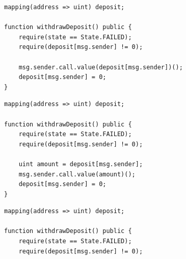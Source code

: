 \documentclass[xcolor=x11names,compress]{beamer}
\begin{document}
\begin{frame}[fragile]
\begin{overprint}
\begin{center}
		\end{center}
		\begin{minipage}[c][0.7\textheight][c]{\textwidth}
			\begin{verbatim}
mapping(address => uint) deposit;

function withdrawDeposit() public {
    require(state == State.FAILED);
    require(deposit[msg.sender] != 0);
    
    msg.sender.call.value(deposit[msg.sender])();
    deposit[msg.sender] = 0;
}
    \end{verbatim}
		\end{minipage}
		\begin{minipage}[c][0.7\textheight][c]{\textwidth}
			\begin{verbatim}
mapping(address => uint) deposit;

function withdrawDeposit() public {
    require(state == State.FAILED);
    require(deposit[msg.sender] != 0);
    
    uint amount = deposit[msg.sender];
    msg.sender.call.value(amount)();
    deposit[msg.sender] = 0;
}
    \end{verbatim}
		\end{minipage}
		\begin{minipage}[c][0.7\textheight][c]{\textwidth}
			\begin{verbatim}
mapping(address => uint) deposit;

function withdrawDeposit() public {
    require(state == State.FAILED);
    require(deposit[msg.sender] != 0);
    

\end{verbatim}
\end{minipage}
\end{overprint}
\end{frame}
\end{document}
